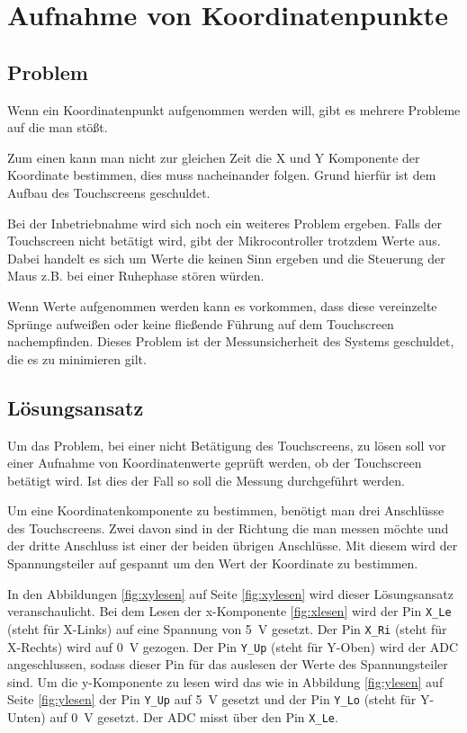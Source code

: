 \chapter{Aufnahme von Koordinatenpunkte}
\section{Problem}
Wenn ein Koordinatenpunkt aufgenommen werden will, gibt es mehrere Probleme auf die man stößt.

Zum einen kann man nicht zur gleichen Zeit die X und Y Komponente der Koordinate bestimmen, dies muss nacheinander folgen.
Grund hierfür ist dem Aufbau des Touchscreens geschuldet.

Bei der Inbetriebnahme wird sich noch ein weiteres Problem ergeben.
Falls der Touchscreen nicht betätigt wird, gibt der Mikrocontroller trotzdem Werte aus.
Dabei handelt es sich um Werte die keinen Sinn ergeben und die Steuerung der Maus z.B. bei einer Ruhephase stören würden.

Wenn Werte aufgenommen werden kann es vorkommen, dass diese vereinzelte Sprünge aufweißen oder keine fließende Führung auf dem Touchscreen nachempfinden.
Dieses Problem ist der Messunsicherheit des Systems geschuldet, die es zu  minimieren gilt.

\section{Lösungsansatz}
Um das Problem, bei einer nicht Betätigung des Touchscreens, zu lösen soll vor einer Aufnahme von Koordinatenwerte geprüft werden, ob der Touchscreen betätigt wird.
Ist dies der Fall so soll die Messung durchgeführt werden.

Um eine Koordinatenkomponente zu bestimmen, benötigt man drei Anschlüsse des Touchscreens.
Zwei davon sind in der Richtung die man messen möchte und der dritte Anschluss ist einer der beiden übrigen Anschlüsse.
Mit diesem wird der Spannungsteiler auf gespannt um den Wert der Koordinate zu bestimmen.

In den Abbildungen \cref{fig:xylesen} auf Seite \cref{fig:xylesen} wird dieser Lösungsansatz veranschaulicht.
Bei dem Lesen der x-Komponente \cref{fig:xlesen} wird der Pin \verb$X_Le$ (steht für X-Links) auf eine Spannung von \SI{5}{V} gesetzt.
Der Pin \verb$X_Ri$ (steht für X-Rechts) wird auf \SI{0}{V} gezogen.
Der Pin  \verb$Y_Up$ (steht für Y-Oben) wird der ADC angeschlussen, sodass dieser Pin für das auslesen der Werte des Spannungsteiler sind.
Um die y-Komponente zu lesen wird das wie in Abbildung \cref{fig:ylesen} auf Seite \cref{fig:ylesen} der Pin \verb$Y_Up$ auf \SI{5}{V} gesetzt und der Pin \verb$Y_Lo$ (steht für Y-Unten) auf \SI{0}{V} gesetzt.
Der ADC misst über den Pin \verb$X_Le$.

